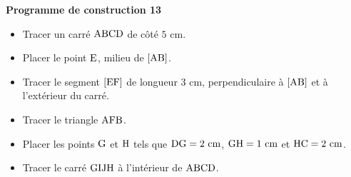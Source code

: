 \documentclass[exercice,a4]{thedocument}%
\begin{document}
%
\noindent\textbf{Programme de construction 13}\par\smallskip\noindent
\begin{itemize}
    \item Tracer un carré $\text{ABCD}$ de côté $5\text{ cm}$.
    \item Placer le point $\text{E}$, milieu de $[\text{AB}]$.
    \item Tracer le segment $[\text{EF}]$ de longueur $3\text{ cm}$,
    perpendiculaire à $[\text{AB}]$ et à l'extérieur du carré.
    \item Tracer le triangle $\text{AFB}$.
    \item Placer les points $\text{G}$ et $\text{H}$ tels que
    $\text{DG}=2\text{ cm}$, $\text{GH}=1\text{ cm}$ et
    $\text{HC}=2\text{ cm}$.
    \item Tracer le carré $\text{GIJH}$ à l'intérieur de
    $\text{ABCD}$.
\end{itemize}
\end{document}

